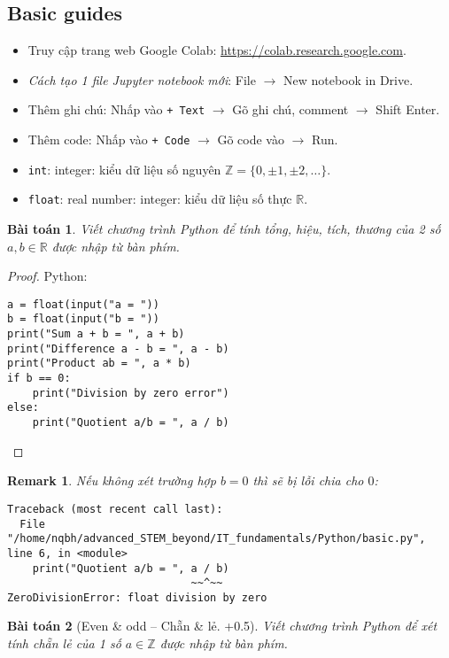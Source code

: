 \documentclass{article}
\newtheorem{baitoan}{Bài toán}
\newtheorem{remark}{Remark}
\begin{document}
\subsection{Basic guides}

\begin{itemize}
	\item Truy cập trang web Google Colab: \url{https://colab.research.google.com}.
	\item {\it Cách tạo 1 file Jupyter notebook mới}: File $\to$ New notebook in Drive.
	\item Thêm ghi chú: Nhấp vào {\tt+ Text} $\to$ Gõ ghi chú, comment $\to$ Shift Enter.
	\item Thêm code: Nhấp vào {\tt+ Code} $\to$ Gõ code vào $\to$ Run.
\end{itemize}

\begin{itemize}
	\item {\tt int}: integer: kiểu dữ liệu số nguyên $\mathbb{Z} = \{0,\pm1,\pm2,\ldots\}$.
	\item {\tt float}: real number: integer: kiểu dữ liệu số thực $\mathbb{R}$.
\end{itemize}

\begin{baitoan}
	Viết chương trình Python để tính tổng, hiệu, tích, thương của 2 số $a,b\in\mathbb{R}$ được nhập từ bàn phím.
\end{baitoan}

\begin{proof}
	Python:
	\begin{verbatim}
a = float(input("a = "))
b = float(input("b = "))
print("Sum a + b = ", a + b)
print("Difference a - b = ", a - b)
print("Product ab = ", a * b)
if b == 0:
    print("Division by zero error")
else:
    print("Quotient a/b = ", a / b)
	\end{verbatim}
\end{proof}

\begin{remark}
	Nếu không xét trường hợp $b = 0$ thì sẽ bị lỗi chia cho $0$:
	\begin{verbatim}
Traceback (most recent call last):
  File "/home/nqbh/advanced_STEM_beyond/IT_fundamentals/Python/basic.py", line 6, in <module>
    print("Quotient a/b = ", a / b)
                             ~~^~~
ZeroDivisionError: float division by zero
	\end{verbatim}
\end{remark}

\begin{baitoan}[Even \& odd -- Chẵn \& lẻ. +0.5]
	Viết chương trình Python để xét tính chẵn lẻ của 1 số $a\in\mathbb{Z}$ được nhập từ bàn phím.
\end{baitoan}
\end{document}
